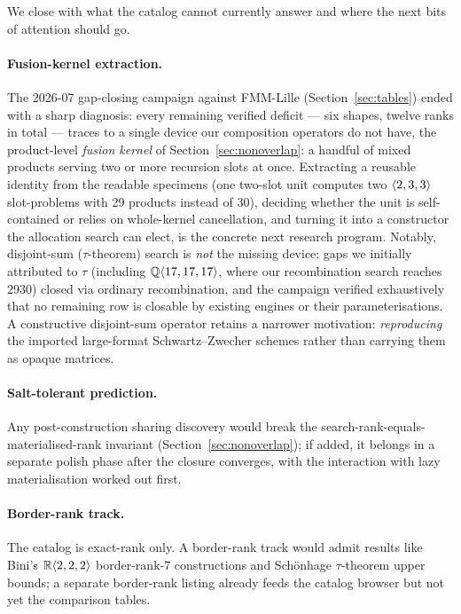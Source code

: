 
We close with what the catalog cannot currently answer and where the
next bits of attention should go.

\paragraph{Fusion-kernel extraction.} The 2026-07 gap-closing
campaign against FMM-Lille (Section~\ref{sec:tables}) ended with a
sharp diagnosis: every remaining verified deficit --- six shapes, twelve
ranks in total --- traces to a single device our composition operators
do not have, the product-level \emph{fusion kernel} of
Section~\ref{sec:nonoverlap}: a handful of mixed products serving two
or more recursion slots at once. Extracting a reusable identity from
the readable specimens (one two-slot unit computes two
\(\langle 2, 3, 3 \rangle\) slot-problems with 29 products instead of 30),
deciding whether the unit is self-contained or relies on whole-kernel
cancellation, and turning it into a constructor the allocation search
can elect, is the concrete next research program. Notably, disjoint-sum
($\tau$-theorem) search is \emph{not} the missing device: gaps we
initially attributed to $\tau$ (including
\(\mathbb{Q}\langle 17, 17, 17 \rangle\), where our recombination search
reaches \(2930\)) closed via ordinary recombination, and the campaign
verified exhaustively that no remaining row is closable by existing
engines or their parameterisations. A constructive disjoint-sum
operator retains a narrower motivation: \emph{reproducing} the imported
large-format Schwartz--Zwecher schemes rather than carrying them as
opaque matrices.

\paragraph{Salt-tolerant prediction.} Any post-construction sharing
discovery would break the search-rank-equals-materialised-rank
invariant (Section~\ref{sec:nonoverlap}); if added, it belongs in a
separate polish phase after the closure converges, with the interaction
with lazy materialisation worked out first.

\paragraph{Border-rank track.} The catalog is exact-rank only. A
border-rank track would admit results like Bini's
\(\mathbb{R}\langle 2, 2, 2 \rangle\) border-rank-\(7\) constructions and
Schönhage $\tau$-theorem upper bounds; a separate border-rank listing
already feeds the catalog browser but not yet the comparison tables.

